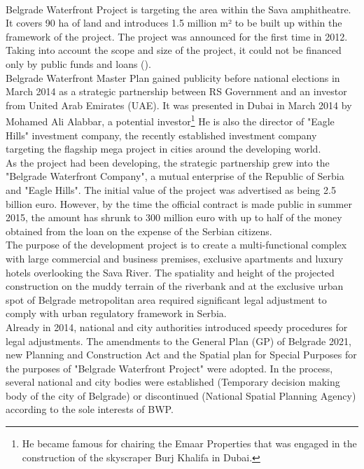 \documentclass[11pt]{report}
\begin{document}
\begin{itemize}
\\
Belgrade Waterfront Project is targeting the area within the Sava amphitheatre.
It covers 90 ha of land and introduces 1.5 million m² to be built up within the framework of the project.
The project was announced for the first time in 2012.
Taking into account the scope and size of the project, it could not be financed only by public funds and loans (\cite{Vukmirovic in Doytchinov et al 2015}).
\\
Belgrade  Waterfront Master Plan gained publicity before national elections in March 2014 as a strategic partnership between RS Government and an investor from United Arab Emirates (UAE).
It was presented in Dubai in March 2014 by  Mohamed Ali Alabbar, a potential investor\footnote{He became famous for chairing the Emaar Properties that was engaged in the construction of the  skyscraper Burj Khalifa in Dubai.}
He is also the  director  of  "Eagle Hills" investment company, the recently established investment company targeting the  flagship mega project in cities around the developing world.
\\
As the project had been developing, the strategic partnership grew into the "Belgrade Waterfront Company", a mutual enterprise of the Republic of Serbia and "Eagle Hills".
The initial value of the project was advertised as being 2.5 billion euro.
However, by the time the official contract is made public in summer 2015, the amount has shrunk to 300 million euro with up to half of the money obtained from the loan on the expense of the Serbian citizens.
\\
The purpose  of  the  development  project  is  to  create  a multi-functional complex with large commercial and business premises, exclusive  apartments and luxury  hotels overlooking  the  Sava  River.
The spatiality and height of the projected construction on the muddy terrain  of the riverbank and at the exclusive urban spot of Belgrade metropolitan area required significant legal adjustment to comply with urban regulatory framework in Serbia. 
\\
Already in 2014, national and city authorities introduced speedy procedures for legal adjustments.
The amendments to the General Plan (GP) of Belgrade 2021, new Planning and Construction Act and the Spatial plan for Special Purposes for the purposes of "Belgrade Waterfront Project" were adopted.
In the process, several national and city bodies were established (Temporary decision making body of the city of Belgrade) or discontinued (National Spatial Planning Agency) according to the sole interests of BWP.

\end{itemize}
\end{document}
